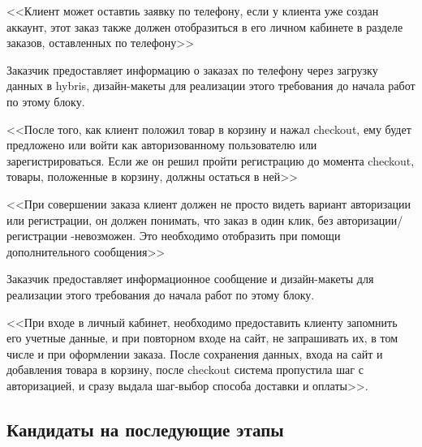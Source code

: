 {
<<Клиент может оставтиь заявку по телефону, если у клиента уже создан аккаунт, этот заказ также должен отобразиться в его личном кабинете в разделе заказов, оставленных по телефону>> 

Заказчик предоставляет информацию о заказах по телефону через загрузку данных в hybris, дизайн-макеты для реализации этого требования до начала работ по этому блоку.
}
{
<<После того, как клиент положил товар в корзину и нажал checkout, ему будет предложено или войти как авторизованному пользователю или зарегистрироваться. Если же он решил пройти регистрацию до момента checkout, товары, положенные в корзину, должны остаться в ней>>
}
{
<<При совершении заказа клиент должен не просто видеть вариант авторизации или регистрации, он должен понимать, что заказ в один клик, без авторизации/регистрации -невозможен. Это необходимо отобразить при помощи дополнительного сообщения>>

Заказчик предоставляет информационное сообщение и дизайн-макеты для реализации этого требования до начала работ по этому блоку.
}
{
<<При входе в личный кабинет, необходимо предоставить клиенту запомнить его учетные данные, и при повторном входе на сайт, не запрашивать их, в том числе и при оформлении заказа. После сохранения данных, входа на сайт и добавления товара в корзину, после checkout система пропустила шаг с авторизацией, и сразу выдала шаг-выбор способа доставки и оплаты>>. 
}

\ifcand
\subsection{Кандидаты на последующие этапы}
\fi

